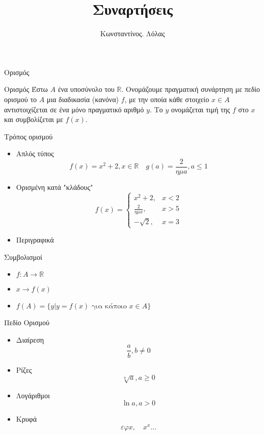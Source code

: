 \documentclass[greek]{beamer}
\title{Συναρτήσεις}
\author[Λόλας]{Κωνσταντίνος. Λόλας}
\date{}
\begin{document}
\begin{frame}
 \titlepage
\end{frame}
\begin{frame}{Ορισμός}
 \begin{block}{Ορισμός}
  Έστω $Α$ ένα υποσύνολο του $\mathbb{R}$. Ονομάζουμε πραγματική συνάρτηση με πεδίο ορισμού το $Α$ μια διαδικασία (κανόνα) $f$, με την οποία κάθε στοιχείο $x\in A$ αντιστοιχίζεται σε ένα μόνο πραγματικό αριθμό $y$. Το $y$ ονομάζεται τιμή της $f$ στο $x$ και συμβολίζεται με $f(x)$.
 \end{block}
\end{frame}

\begin{frame}{Τρόπος ορισμού}
 \begin{itemize}
  \item<1-> Απλός τύπος
        $$f(x)=x^2+2,x\in\mathbb{R}\quad g(a)=\frac{2}{ημa}, a\le1$$
  \item<2-> Ορισμένη κατά "κλάδους"
        $$
         f(x)=
         \begin{cases}
          x^2+2,         & x<2 \\
          \frac{2}{ημx}, & x>5 \\
          -\sqrt{2},     & x=3
         \end{cases}
        $$
  \item<3-> Περιγραφικά
 \end{itemize}
\end{frame}

\begin{frame}{Συμβολισμοί}
 \begin{itemize}
  \item $f:A\to\mathbb{R}$
  \item $x\to f(x)$
  \item $f(A)=\{y| y=f(x)\text{ για κάποιο }x\in A\}$
 \end{itemize}
\end{frame}

\begin{frame}{Πεδίο Ορισμού}
 \begin{itemize}
  \item<1-> Διαίρεση
        $$\frac{a}{b},b\ne 0$$
  \item<2-> Ρίζες
        $$\sqrt[n]{a},a\ge 0$$
  \item<3-> Λογάριθμοι
        $$\ln a,a > 0$$
  \item<4-> Κρυφά
        $$εφx,\quad x^x\ldots$$
 \end{itemize}
\end{frame}
\end{document}
